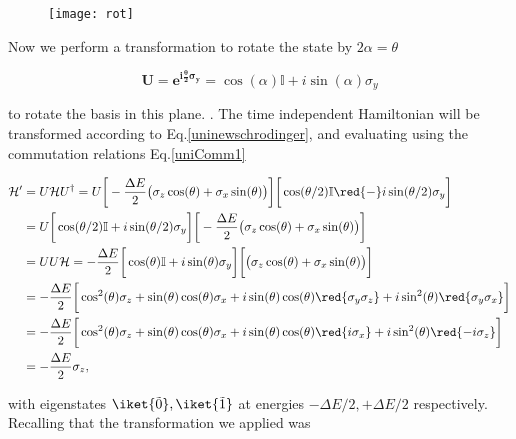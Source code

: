 \begin{figure}[h]
  \centering \texttt{[image: rot]}
\end{figure}

\noindent

\noindent  Now  we perform  a  transformation  to  rotate the  state  by
$ 2\alpha = \theta $

  \begin{equation}
    \mathbf{U=e^{i\frac{\theta}{2}\sigma_y}} =  \cos(\alpha)\mathbb{I}+i\sin(\alpha)\sigma_y
  \end{equation}

  \noindent to rotate  the basis in this  plane.  .  The
  {time  independent  Hamiltonian}  will  be  transformed  according  to
  Eq.\eqref{uninewschrodinger},  and  evaluating using  the  commutation
  relations Eq.\eqref{uniComm1}

  \begin{equation}\label{uniRot}
    \begin{aligned}
      \mathcal{H}' & = U\mathcal{H}U^{\dagger} = U \bigg[-\frac{\Delta E}{2}\big(\sigma_z\cos(\theta)+\sigma_x\sin(\theta)\big)\bigg]\bigg[\cos(\theta/2)\mathbb{I}\red{-}i\sin(\theta/2)\sigma_y\bigg]\\
      & = U \bigg[\cos(\theta/2)\mathbb{I}+i\sin(\theta/2)\sigma_y\bigg]\bigg[-\frac{\Delta E}{2}\big(\sigma_z\cos(\theta)+\sigma_x\sin(\theta)\big)\bigg]\\
      & = UU\mathcal{H} =-\frac{\Delta E}{2} \bigg[\cos(\theta)\mathbb{I}+i\sin(\theta)\sigma_y\bigg]\bigg[\big(\sigma_z\cos(\theta)+\sigma_x\sin(\theta)\big)\bigg]\\
      & = -\frac{\Delta E}{2}\bigg[\cos^2(\theta)\sigma_z+\sin(\theta)\cos(\theta)\sigma_x+i\sin(\theta)\cos(\theta)\red{\sigma_y\sigma_z}+i\sin^2(\theta)\red{\sigma_y\sigma_x}\bigg]\\
      & = -\frac{\Delta E}{2}\bigg[\cos^2(\theta)\sigma_z+\sin(\theta)\cos(\theta)\sigma_x+i\sin(\theta)\cos(\theta)\red{i\sigma_x}+i\sin^2(\theta)\red{-i\sigma_z}\bigg]\\
      & = -\frac{\Delta E}{2}\sigma_z,
    \end{aligned}
  \end{equation}


  \noindent with  eigenstates $ \iket{\tilde{0}}, \iket{\tilde{1}}  $ at
  energies $  -\Delta E/2, +\Delta  E/2 $ respectively.   Recalling that
  the transformation we applied was

